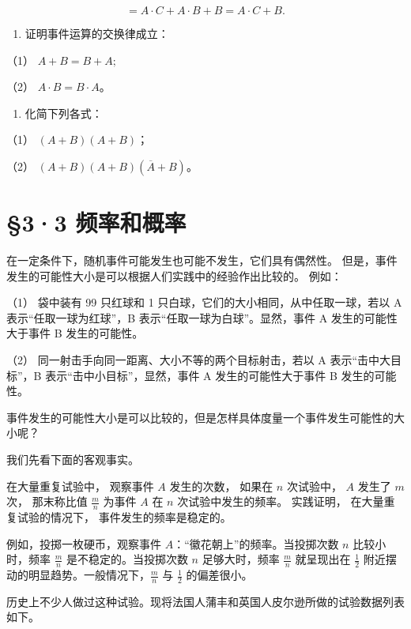 \[
= A \cdot C + A \cdot B + B = A \cdot C + B.
\]

\begin{enumerate}
\item
  证明事件运算的交换律成立：
\end{enumerate}

（1） \(A + B = B + A;\)

（2） \(A \cdot B = B \cdot A\)。

\begin{enumerate}[start=2]
\item
  化简下列各式：
\end{enumerate}

（1） \((A + B)(A + B)\)；

（2） \((A + B)(A + B)(\overline{A} + B)\)。

\section{§3·3 频率和概率}

在一定条件下，随机事件可能发生也可能不发生，它们具有偶然性。
但是，事件发生的可能性大小是可以根据人们实践中的经验作出比较的。 例如：

（1） 袋中装有 99 只红球和 1 只白球，它们的大小相同，从中任取一球，若以
A 表示``任取一球为红球''，B 表示``任取一球为白球''。显然，事件 A
发生的可能性大于事件 B 发生的可能性。

（2） 同一射击手向同一距离、大小不等的两个目标射击，若以 A
表示``击中大目标''，B 表示``击中小目标''，显然，事件 A
发生的可能性大于事件 B 发生的可能性。

事件发生的可能性大小是可以比较的，但是怎样具体度量一个事件发生可能性的大小呢？

我们先看下面的客观事实。

在大量重复试验中， 观察事件 \(A\) 发生的次数， 如果在 \(n\) 次试验中，
\(A\) 发生了 \(m\) 次， 那末称比值 \(\frac{m}{n}\) 为事件 \(A\) 在 \(n\)
次试验中发生的频率。 实践证明， 在大量重复试验的情况下，
事件发生的频率是稳定的。

例如，投掷一枚硬币，观察事件 \(A\)：``徽花朝上''的频率。当投掷次数 \(n\)
比较小时，频率 \(\frac{m}{n}\) 是不稳定的。当投掷次数 \(n\)
足够大时，频率 \(\frac{m}{n}\) 就呈现出在 \(\frac{1}{2}\)
附近摆动的明显趋势。一般情况下，\(\frac{m}{n}\) 与 \(\frac{1}{2}\)
的偏差很小。

历史上不少人做过这种试验。现将法国人蒲丰和英国人皮尔逊所做的试验数据列表如下。

